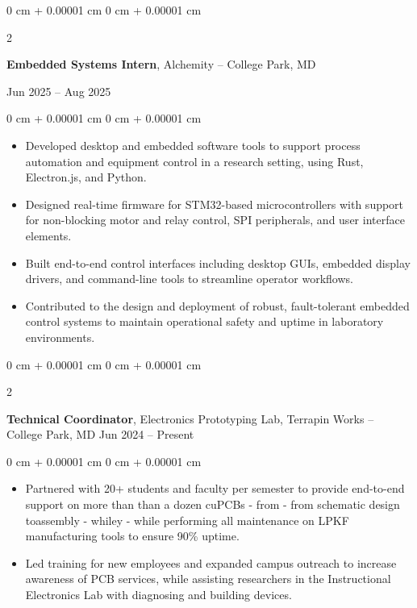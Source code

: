 \documentclass[10pt, letterpaper]{article}
\newenvironment{highlights}{
    \begin{itemize}[
        topsep=0.10 cm,
        parsep=0.10 cm,
        partopsep=0pt,
        itemsep=0pt,
        leftmargin=0 cm + 10pt
    ]
}{
    \end{itemize}
} %
\newenvironment{onecolentry}{
    \begin{adjustwidth}{
        0 cm + 0.00001 cm
    }{
        0 cm + 0.00001 cm
    }
}{
    \end{adjustwidth}
} %
\newenvironment{twocolentry}[2][]{
    \onecolentry
    \def\secondColumn{#2}
    \setcolumnwidth{\fill, 4.5 cm}
    \begin{paracol}{2}
}{
    \switchcolumn \raggedleft \secondColumn
    \end{paracol}
    \endonecolentry
} %
\begin{document}
        \begin{twocolentry}{
            Jun 2025 – Aug 2025
        }
            \textbf{Embedded Systems Intern}, Alchemity -- College Park, MD
        \end{twocolentry}
        \vspace{0.10 cm}
        \begin{onecolentry}
            \begin{highlights}
                \item Developed desktop and embedded software tools to support process automation and equipment control in a research setting, using Rust, Electron.js, and Python.
                \item Designed real-time firmware for STM32-based microcontrollers with support for non-blocking motor and relay control, SPI peripherals, and user interface elements.
                \item Built end-to-end control interfaces including desktop GUIs, embedded display drivers, and command-line tools to streamline operator workflows.
                \item Contributed to the design and deployment of robust, fault-tolerant embedded control systems to maintain operational safety and uptime in laboratory environments.
            \end{highlights}
        \end{onecolentry}

        \vspace{0.2 cm}

        \begin{twocolentry}{
            Jun 2024 – Present
        }
            \textbf{Technical Coordinator}, Electronics Prototyping Lab, Terrapin Works -- College Park, MD \end{twocolentry}
        \vspace{0.10 cm}
        \begin{onecolentry}
            \begin{highlights}
                \item Partnered with 20+ students and faculty per semester to provide end-to-end support on more than than a dozen cuPCBs - from - from schematic design toassembly - whiley - while performing all maintenance on LPKF manufacturing tools to ensure 90\% uptime.
                \item Led training for new employees and expanded campus outreach to increase awareness of PCB services, while assisting researchers in the Instructional Electronics Lab with diagnosing and building devices.
            \end{highlights}
        \end{onecolentry}
        
\end{document}
